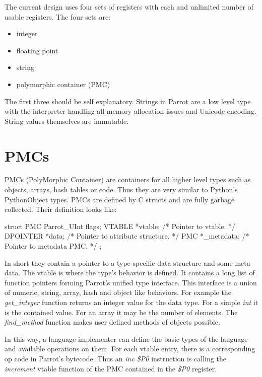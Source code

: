 \documentclass[bachelor,english]{hgbthesis}
\begin{document}
The current design uses four sets of registers with each and unlimited number of usable registers. The four sets are:
%
\begin{itemize}
\item integer
\item floating point
\item string
\item polymorphic container (PMC)
\end{itemize}

The first three should be self explanatory. Strings in Parrot are a low level type with the interpreter handling all memory allocation issues and Unicode encoding. String values themselves are immutable.

\section{PMCs}
\label{sec:PMCs}

PMCs (PolyMorphic Container) are containers for all higher level types such as objects, arrays, hash tables or code. Thus they are very similar to Python's PythonObject types. PMCs are defined by C structs and are fully garbage collected. Their definition looks like:
\begin{CCode}
struct PMC {
    Parrot_UInt    flags;
    VTABLE         *vtable;             /* Pointer to vtable. */
    DPOINTER       *data;               /* Pointer to attribute structure. */
    PMC            *_metadata;          /* Pointer to metadata PMC. */
};
\end{CCode}
In short they contain a pointer to a type specific data structure and some meta data. The vtable is where the type's behavior is defined. It contains a long list of function pointers forming Parrot's unified type interface. This interface is a union of numeric, string, array, hash and object like behaviors. For example the  \textit{get\_integer} function returns an integer value for the data type. For a simple \textit{int} it is the contained value. For an array it may be the number of elements. The \textit{find\_method} function makes user defined methods of objects possible.

In this way, a language implementer can define the basic types of the language and available operations on them. For each vtable entry, there is a corresponding op code in Parrot's bytecode. Thus an \textit{inc \$P0} instruction is calling the \textit{increment} vtable function of the PMC contained in the \textit{\$P0} register.
\end{document}
